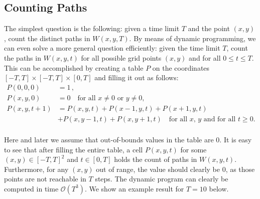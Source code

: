 \documentclass[11pt,a4paper,twoside,british]{article}
\begin{document}
\subsection{Counting Paths}
The simplest question is the following: given a time limit $T$ and the point
$(x, y)$, count the distinct paths in $W(x, y, T)$.
By means of dynamic programming, we can even solve a more general question
efficiently: given the time limit $T$, count the paths in $W(x, y, t)$ for all
possible grid points $(x, y)$ and for all $0 \leq t \leq T$.
This can be accomplished by creating a table $P$ on the coordinates
$[-T, T] \times [-T, T] \times [0, T]$ and filling it out as follows:
\begin{align*}
P(0, 0, 0) &= 1\,,\\
P(x, y, 0) &= 0 \quad\text{for all $x \neq 0$ or $y \neq 0$,}\\
P(x, y, t + 1) &= P(x, y, t) + P(x - 1, y, t) + P(x + 1, y, t)\\
&+ P(x, y - 1, t) + P(x, y + 1, t)
\quad\text{for all $x$, $y$ and for all $t \geq 0$.}\\
\end{align*}

Here and later we assume that out-of-bounds values in the table are $0$.
It is easy to see that after filling the entire table, a cell $P(x, y, t)$ for
some $(x, y) \in [-T, T]^2$ and $t \in [0, T]$ holds the count of paths in
$W(x, y, t)$.
Furthermore, for any $(x, y)$ out of range, the value should clearly be $0$, as
those points are not reachable in $T$ steps.
The dynamic program can clearly be computed in time $\mathcal{O}(T^3)$.
We show an example result for $T = 10$ below.
\end{document}
